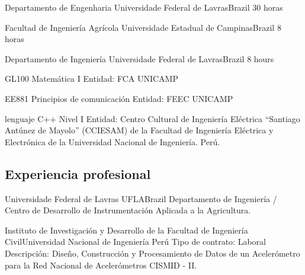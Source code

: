 \documentclass[11pt,a4paper,sans]{moderncv} %
\begin{document}

	      {Departamento de Engenharia}
	      {Universidade Federal de Lavras}{Brazil}
	      {30 horas}
	      
\begin{comment}
\cventry{2do Semestre 2018}{PSI528 - Processamento de sinais}
	      {Departamento de Engenharia}
	      {Universidade Federal de Lavras}{Brazil}
	      {30 horas }
\cventry{1ro Semestre 2018}{PSI528 - Processamento de sinais}
	      {Departamento de Engenharia}
	      {Universidade Federal de Lavras}{Brazil}
	      {30 horas }
\end{comment}
	      
	      {Facultad de Ingeniería Agrícola}
	      {Universidade Estadual de Campinas}{Brazil}
	      {8 horas }
	      
	      {Departamento de Ingeniería}
	      {Universidade Federal de Lavras}{Brazil}
	      {8 hours}
	      
			  {GL100 }{Matemática I}{}
			  {Entidad: FCA UNICAMP }

			  {EE881 }{Principios de comunicación}{}
			  {Entidad: FEEC UNICAMP }

	      {lenguaje C++ }{ Nivel I}{}
	      {Entidad: Centro Cultural de Ingeniería Eléctrica ``Santiago
 Antúnez de Mayolo'' (CCIESAM) de la Facultad de Ingeniería Eléctrica
 y Electrónica de la Universidad Nacional de Ingeniería. Perú.}

\subsection{Experiencia profesional}


	      {Universidade Federal de Lavras}
	      {UFLA}{Brazil}
	      {Departamento de Ingeniería / Centro de Desarrollo de Instrumentación Aplicada a la Agricultura.}


		      {Instituto de Investigación y Desarrollo de la Facultad
 de Ingeniería Civil}{Universidad Nacional de Ingeniería }{Perú}
		      {Tipo de contrato: Laboral\newline{}
		      Descripción: Diseño, Construcción y Procesamiento de Datos de un
 Acelerómetro para la Red Nacional de Acelerómetros CISMID - II.}
\end{document}
